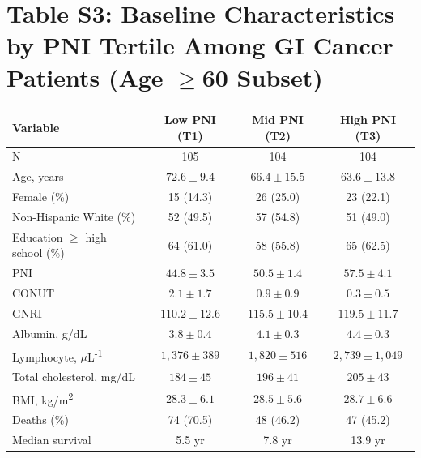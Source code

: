 \documentclass[11pt,a4paper]{article}
\begin{document}
\section*{Table S3: Baseline Characteristics by PNI Tertile Among GI Cancer Patients (Age $\ge$60 Subset)}
\label{tab:s3}
\begin{center}
\begin{tabular}{lccc}
\toprule
Variable & Low PNI (T1) & Mid PNI (T2) & High PNI (T3) \\
\midrule
N & 105 & 104 & 104 \\
Age, years & $72.6\pm9.4$ & $66.4\pm15.5$ & $63.6\pm13.8$ \\
Female (\%) & 15 (14.3) & 26 (25.0) & 23 (22.1) \\
Non-Hispanic White (\%) & 52 (49.5) & 57 (54.8) & 51 (49.0) \\
Education $\ge$ high school (\%) & 64 (61.0) & 58 (55.8) & 65 (62.5) \\
PNI & $44.8\pm3.5$ & $50.5\pm1.4$ & $57.5\pm4.1$ \\
CONUT & $2.1\pm1.7$ & $0.9\pm0.9$ & $0.3\pm0.5$ \\
GNRI & $110.2\pm12.6$ & $115.5\pm10.4$ & $119.5\pm11.7$ \\
Albumin, g/dL & $3.8\pm0.4$ & $4.1\pm0.3$ & $4.4\pm0.3$ \\
Lymphocyte, $\mu$L\textsuperscript{-1} & $1,376\pm389$ & $1,820\pm516$ & $2,739\pm1,049$ \\
Total cholesterol, mg/dL & $184\pm45$ & $196\pm41$ & $205\pm43$ \\
BMI, kg/m\textsuperscript{2} & $28.3\pm6.1$ & $28.5\pm5.6$ & $28.7\pm6.6$ \\
Deaths (\%) & 74 (70.5) & 48 (46.2) & 47 (45.2) \\
Median survival & 5.5 yr & 7.8 yr & 13.9 yr \\
\bottomrule
\end{tabular}
\end{center}

\end{document}
